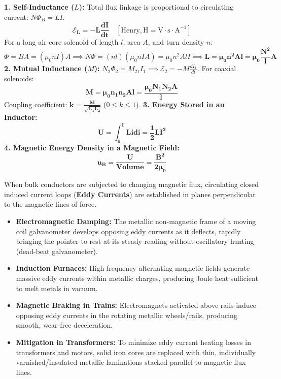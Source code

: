 \documentclass[10pt,a4paper]{article}
\begin{document}
\begin{formulabox}
\textbf{1. Self-Inductance ($L$):}
Total flux linkage is proportional to circulating current: $N \Phi_B = L I$.
\begin{equation}
  \mathbf{\mathcal{E}_L = -L \frac{dI}{dt}} \quad [\mathrm{Henry}, \mathrm{H} = \mathrm{V}\cdot\mathrm{s}\cdot\mathrm{A}^{-1}]
\end{equation}
For a long air-core solenoid of length $l$, area $A$, and turn density $n$:
\begin{equation}
  \Phi = B A = (\mu_0 n I) A \implies N \Phi = (n l)(\mu_0 n I A) = \mu_0 n^2 A l I \implies \mathbf{L = \mu_0 n^2 A l = \mu_0 \frac{N^2}{l} A}
\end{equation}
\textbf{2. Mutual Inductance ($M$):}
$N_2 \Phi_2 = M_{21} I_1 \implies \mathcal{E}_2 = -M \frac{dI_1}{dt}$. For coaxial solenoids:
\begin{equation}
  \mathbf{M = \mu_0 n_1 n_2 A l = \frac{\mu_0 N_1 N_2 A}{l}}
\end{equation}
Coupling coefficient: $\mathbf{k = \frac{M}{\sqrt{L_1 L_2}}}$ ($0 \le k \le 1$).
\textbf{3. Energy Stored in an Inductor:}
\begin{equation}
  \mathbf{U = \int_0^I L i di = \frac{1}{2} L I^2}
\end{equation}
\textbf{4. Magnetic Energy Density in a Magnetic Field:}
\begin{equation}
  \mathbf{u_B = \frac{U}{\text{Volume}} = \frac{B^2}{2\mu_0}}
\end{equation}
\end{formulabox}

\begin{ncertbox}
When bulk conductors are subjected to changing magnetic flux, circulating closed induced current loops (\textbf{Eddy Currents}) are established in planes perpendicular to the magnetic lines of force.
\begin{itemize}
  \item \textbf{Electromagnetic Damping:} The metallic non-magnetic frame of a moving coil galvanometer develops opposing eddy currents as it deflects, rapidly bringing the pointer to rest at its steady reading without oscillatory hunting (dead-beat galvanometer).
  \item \textbf{Induction Furnaces:} High-frequency alternating magnetic fields generate massive eddy currents within metallic charges, producing Joule heat sufficient to melt metals in vacuum.
  \item \textbf{Magnetic Braking in Trains:} Electromagnets activated above rails induce opposing eddy currents in the rotating metallic wheels/rails, producing smooth, wear-free deceleration.
  \item \textbf{Mitigation in Transformers:} To minimize eddy current heating losses in transformers and motors, solid iron cores are replaced with thin, individually varnished/insulated metallic laminations stacked parallel to magnetic flux lines.
\end{itemize}
\end{ncertbox}
\end{document}

